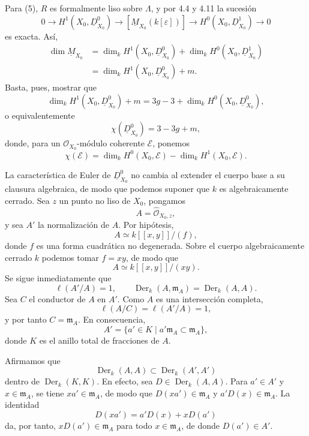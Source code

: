 \par
Para (5), $R$ es formalmente liso sobre $\Lambda$, y por 4.4 y 4.11
la sucesión
\[
0\longrightarrow H^1(X_0,\underline D^0_{X_0})
 \longrightarrow[\underline M_{X_0}(k[\varepsilon])]
 \longrightarrow H^0(X_0,\underline D^1_{X_0})
 \longrightarrow0
\]
es exacta. Así,
\[
\begin{aligned}
\dim\underline M_{X_0}
&=\dim_kH^1(X_0,\underline D^0_{X_0})
 +\dim_kH^0(X_0,\underline D^1_{X_0})\\
&=\dim_kH^1(X_0,\underline D^0_{X_0})+m.
\end{aligned}
\]
Basta, pues, mostrar que
\[
\dim_kH^1(X_0,\underline D^0_{X_0})+m
=3g-3+\dim_kH^0(X_0,\underline D^0_{X_0}),
\]
o equivalentemente
\[
\chi(\underline D^0_{X_0})=3-3g+m,
\]
donde, para un $\mathcal O_{X_0}$-módulo coherente $\mathcal E$,
ponemos
\[
\chi(\mathcal E)
=\dim_kH^0(X_0,\mathcal E)-\dim_kH^1(X_0,\mathcal E).
\]

La característica de Euler de $\underline D^0_{X_0}$ no cambia al
extender el cuerpo base a su clausura algebraica, de modo que podemos
suponer que $k$ es algebraicamente cerrado. Sea $z$ un punto no liso
de $X_0$, pongamos
\[
A=\widehat{\mathcal O}_{X_0,z},
\]
y sea $A'$ la normalización de $A$. Por hipótesis,
\[
A\simeq k[[x,y]]/(f),
\]
donde $f$ es una forma cuadrática no degenerada. Sobre el cuerpo
algebraicamente cerrado $k$ podemos tomar $f=xy$, de modo que
\[
A\simeq k[[x,y]]/(xy).
\]
Se sigue inmediatamente que
\[
\ell(A'/A)=1,
\qquad
\operatorname{Der}_k(A,\mathfrak m_A)
=\operatorname{Der}_k(A,A).
\]
Sea $C$ el conductor de $A$ en $A'$. Como $A$ es una intersección
completa,
\[
\ell(A/C)=\ell(A'/A)=1,
\]
y por tanto $C=\mathfrak m_A$. En consecuencia,
\[
A'=\{a'\in K\mid a'\mathfrak m_A\subset\mathfrak m_A\},
\]
donde $K$ es el anillo total de fracciones de $A$.

Afirmamos que
\[
\operatorname{Der}_k(A,A)
 \subset\operatorname{Der}_k(A',A')
\]
dentro de $\operatorname{Der}_k(K,K)$. En efecto, sea
$D\in\operatorname{Der}_k(A,A)$. Para $a'\in A'$ y
$x\in\mathfrak m_A$, se tiene $xa'\in\mathfrak m_A$, de modo que
$D(xa')\in\mathfrak m_A$ y $a'D(x)\in\mathfrak m_A$. La identidad
\[
D(xa')=a'D(x)+xD(a')
\]
da, por tanto, $xD(a')\in\mathfrak m_A$ para todo
$x\in\mathfrak m_A$, de donde $D(a')\in A'$.


